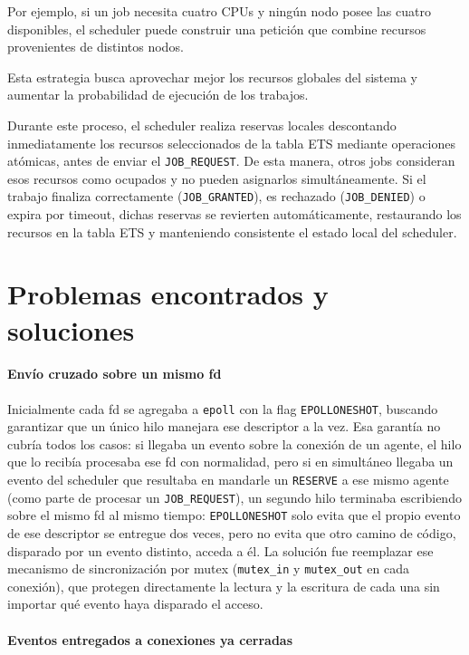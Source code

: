 \documentclass[a4paper,10pt]{article}
\begin{document}
\noindent Por ejemplo, si un job necesita cuatro CPUs y ningún nodo posee las cuatro disponibles, el scheduler puede construir una petición que combine recursos provenientes de distintos nodos.

\noindent Esta estrategia busca aprovechar mejor los recursos globales del sistema y aumentar la probabilidad de ejecución de los trabajos.

\noindent Durante este proceso, el scheduler realiza reservas locales descontando inmediatamente los recursos seleccionados de la tabla ETS mediante operaciones atómicas, antes de enviar el \texttt{JOB\_REQUEST}. De esta manera, otros jobs consideran esos recursos como ocupados y no pueden asignarlos simultáneamente. Si el trabajo finaliza correctamente (\texttt{JOB\_GRANTED}), es rechazado (\texttt{JOB\_DENIED}) o expira por timeout, dichas reservas se revierten automáticamente, restaurando los recursos en la tabla ETS y manteniendo consistente el estado local del scheduler.

\section{Problemas encontrados y soluciones}
\paragraph{Envío cruzado sobre un mismo fd}

Inicialmente cada fd se agregaba a \texttt{epoll} con la flag \texttt{EPOLLONESHOT}, buscando garantizar que un único hilo manejara ese descriptor a la vez. Esa garantía no cubría todos los casos: si llegaba un evento sobre la conexión de un agente, el hilo que lo recibía procesaba ese fd con normalidad, pero si en simultáneo llegaba un evento del scheduler que resultaba en mandarle un \texttt{RESERVE} a ese mismo agente (como parte de procesar un \texttt{JOB\_REQUEST}), un segundo hilo terminaba escribiendo sobre el mismo fd al mismo tiempo: \texttt{EPOLLONESHOT} solo evita que el propio evento de ese descriptor se entregue dos veces, pero no evita que otro camino de código, disparado por un evento distinto, acceda a él. La solución fue reemplazar ese mecanismo de sincronización por mutex (\texttt{mutex\_in} y \texttt{mutex\_out} en cada conexión), que protegen directamente la lectura y la escritura de cada una sin importar qué evento haya disparado el acceso.

\paragraph{Eventos entregados a conexiones ya cerradas}
\end{document}
